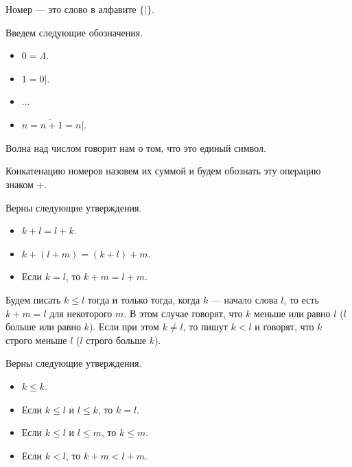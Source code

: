     \begin{Def}[Номер]
        Номер --- это слово в алфавите $\{ | \}$.
    \end{Def}

    \begin{Rem}
        Введем следующие обозначения.
        \begin{itemize}
            \item $0 = \Lambda$.
            \item $1 = 0|$.
            \item ...
            \item $n = \widetilde{n + 1} = n|$.
        \end{itemize}
        Волна над числом говорит нам о том, что это единый символ.
    \end{Rem}

    \begin{Def}[Сумма]
        Конкатенацию номеров назовем их суммой и будем обознать эту операцию знаком +.
    \end{Def}

    \begin{Thm}
        Верны следующие утверждения.
        \begin{itemize}
            \item $k + l = l + k$.
            \item $k + (l + m) = (k + l) + m$.
            \item Если $k = l$, то $k + m = l + m$.
        \end{itemize}
    \end{Thm}

    \begin{Def}[<, $\leq$]
        Будем писать $k \leq l$ тогда и только тогда, когда $k$ --- начало слова $l$, то есть $k + m = l$ для некоторого $m$. В этом случае говорят, что $k$ меньше или равно $l$ ($l$ больше или равно $k$). Если при этом $k \neq l$, то пишут $k < l$ и говорят, что $k$ строго меньше $l$ ($l$ строго больше $k$).
    \end{Def}

    \begin{Thm}
        Верны следующие утверждения.
        \begin{itemize}
            \item $k \leq k$.
            \item Если $k \leq l$ и $l \leq k$, то $k = l$.
            \item Если $k \leq l$ и $l \leq m$, то $k \leq m$. 
            \item Если $k < l$, то $k + m < l + m$.
        \end{itemize}
    \end{Thm}

